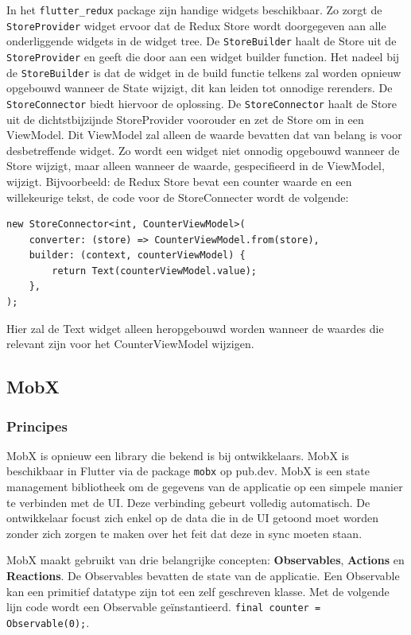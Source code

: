 In het \verb|flutter_redux| package zijn handige widgets beschikbaar. Zo zorgt de \verb|StoreProvider| widget ervoor dat de Redux Store wordt doorgegeven aan alle onderliggende widgets in de widget tree. De \verb|StoreBuilder| haalt de Store uit de \verb|StoreProvider| en geeft die door aan een widget builder function. Het nadeel bij de \verb|StoreBuilder| is dat de widget in de build functie telkens zal worden opnieuw opgebouwd wanneer de State wijzigt, dit kan leiden tot onnodige rerenders. De \verb|StoreConnector| biedt hiervoor de oplossing. De \verb|StoreConnector| haalt de Store uit de dichtstbijzijnde StoreProvider voorouder en zet de Store om in een ViewModel. Dit ViewModel zal alleen de waarde bevatten dat van belang is voor desbetreffende widget. Zo wordt een widget niet onnodig opgebouwd wanneer de Store wijzigt, maar alleen wanneer de waarde, gespecifieerd in de ViewModel, wijzigt. Bijvoorbeeld: de Redux Store bevat een counter waarde en een willekeurige tekst, de code voor de StoreConnecter wordt de volgende: 

\begin{verbatim}
new StoreConnector<int, CounterViewModel>(
    converter: (store) => CounterViewModel.from(store),
    builder: (context, counterViewModel) {
        return Text(counterViewModel.value);
    },
);
\end{verbatim}
Hier zal de Text widget alleen heropgebouwd worden wanneer de waardes die relevant zijn voor het CounterViewModel wijzigen.


\subsection{MobX}
\label{ch:mobx}
\subsubsection{Principes}
MobX is opnieuw een library die bekend is bij ontwikkelaars. MobX is beschikbaar in Flutter via de package \verb|mobx| op pub.dev. MobX is een state management bibliotheek om de gegevens van de applicatie op een simpele manier te verbinden met de UI. Deze verbinding gebeurt volledig automatisch. De ontwikkelaar focust zich enkel op de data die in de UI getoond moet worden zonder zich zorgen te maken over het feit dat deze in sync moeten staan.

MobX maakt gebruikt van drie belangrijke concepten: \textbf{Observables}, \textbf{Actions} en \textbf{Reactions}.
\newline
De Observables bevatten de state van de applicatie. Een Observable kan een primitief datatype zijn tot een zelf geschreven klasse. Met de volgende lijn code wordt een Observable geïnstantieerd. \verb|final counter = Observable(0);|.

